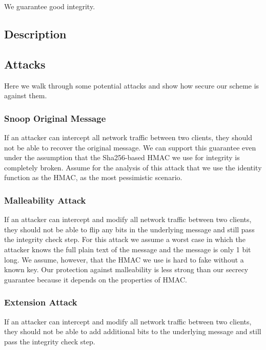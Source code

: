 \documentclass[twocolumn]{article}
\begin{document}
We guarantee good integrity.

\subsection{Description}

\subsection{Attacks}
Here we walk through some potential attacks and show how secure our scheme is against them.

\subsubsection{Snoop Original Message}
If an attacker can intercept all network traffic between two clients, they should not be able to recover the original message.
We can support this guarantee even under the assumption that the Sha256-based HMAC we use for integrity is completely broken.
Assume for the analysis of this attack that we use the identity function as the HMAC, as the most pessimistic scenario.

\subsubsection{Malleability Attack}
If an attacker can intercept and modify all network traffic between two clients, they should not be able to flip any bits in the underlying message and still pass the integrity check step.
For this attack we assume a worst case in which the attacker knows the full plain text of the message and the message is only 1 bit long.
We assume, however, that the HMAC we use is hard to fake without a known key.
Our protection against malleability is less strong than our secrecy guarantee because it depends on the properties of HMAC.

\subsubsection{Extension Attack}
If an attacker can intercept and modify all network traffic between two clients, they should not be able to add additional bits to the underlying message and still pass the integrity check step.
\end{document}
